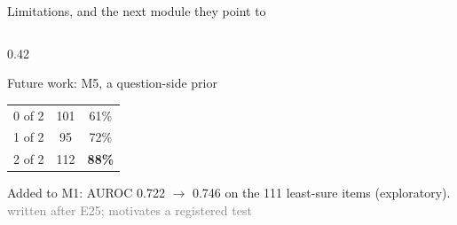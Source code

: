 \documentclass[aspectratio=169,10pt]{beamer}
\newcommand{\hl}[1]{\textcolor{accent}{\textbf{#1}}}
\newcommand{\src}[1]{{\scriptsize\textcolor{gray}{#1}}}
\begin{document}
\begin{frame}{Limitations, and the next module they point to}
\begin{columns}[T]
\begin{column}{0.42\textwidth}
\begin{block}{Future work: M5, a question-side prior}
\begin{tabular}{@{}ccc@{}}
          \midrule
          0 of 2 & 101 & 61\% \\
          1 of 2 & 95 & 72\% \\
          2 of 2 & 112 & \hl{88\%} \\
          \bottomrule
        \end{tabular}
        \par\vspace{3pt}\raggedright
        Added to M1: AUROC 0.722 $\rightarrow$ 0.746 on the 111 least-sure items (exploratory). \src{written after E25; motivates a registered test}
      \end{block}
    \end{column}
  \end{columns}
\end{frame}

\end{document}
